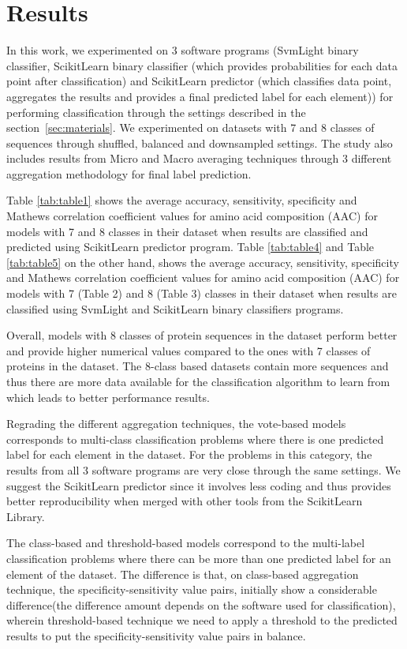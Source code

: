 \section {Results}
\label{sec:results}

In this work, we experimented on 3 software programs (SvmLight binary classifier, ScikitLearn binary classifier 
(which provides probabilities for each data point after classification) and ScikitLearn predictor 
(which classifies data point, aggregates the results and provides a final predicted label for each element)) 
for performing classification through the settings described in the section~\ref{sec:materials}. 
We experimented on datasets with 7 and 8 classes of sequences through shuffled, balanced and downsampled settings. 
The study also includes results from Micro and Macro averaging techniques through 3 different aggregation methodology 
for final label prediction.

Table \ref{tab:table1} shows the average accuracy, sensitivity, specificity and Mathews correlation coefficient values 
for amino acid composition (AAC) for models with 7 and 8 classes in their dataset when results are classified and predicted 
using ScikitLearn predictor program. Table \ref{tab:table4} and Table \ref{tab:table5} on the other hand, 
shows the average accuracy, sensitivity, specificity and Mathews correlation coefficient values for amino acid composition (AAC) 
for models with 7 (Table 2) and 8 (Table 3) classes in their dataset when results are classified using SvmLight 
and ScikitLearn binary classifiers programs.

Overall, models with 8 classes of protein sequences in the dataset perform better and provide higher numerical values 
compared to the ones with 7 classes of proteins in the dataset. The 8-class based datasets contain more sequences and 
thus there are more data available for the classification algorithm to learn from which leads to better performance results.

Regrading the different aggregation techniques, the vote-based models corresponds to multi-class classification 
problems where there is one predicted label for each element in the dataset. For the problems in this category, 
the results from all 3 software programs are very close through the same settings. We suggest the ScikitLearn predictor 
since it involves less coding and thus provides better reproducibility when merged with other tools from the ScikitLearn Library.

The class-based and threshold-based models correspond to the multi-label classification problems where there can 
be more than one predicted label for an element of the dataset. The difference is that, on class-based aggregation technique, 
the specificity-sensitivity value pairs, initially show a considerable difference(the difference amount depends on 
the software used for classification), wherein threshold-based technique we need to apply a threshold to 
the predicted results to put the specificity-sensitivity value pairs in balance.

